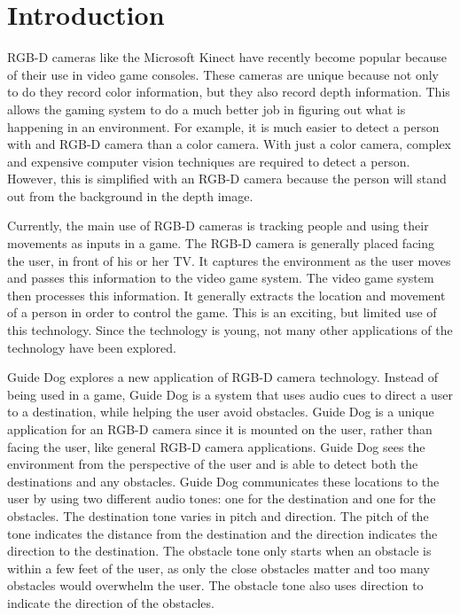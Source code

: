 \section{Introduction}
\label{sec:intro}

RGB-D cameras like the Microsoft Kinect\cite{kinect-website} have recently
become popular because of their use in video game consoles. These cameras are
unique because not only to do they record color information, but they also record
depth information. This allows the gaming system to do a much better job in
figuring out what is happening in an environment. For example, it is much easier
to detect a person with and RGB-D camera than a color camera. With just a color
camera, complex and expensive computer vision techniques are required to detect
a person. However, this is simplified with an RGB-D camera because the person
will stand out from the background in the depth image.

Currently, the main use of RGB-D cameras is tracking people and using their
movements as inputs in a game. The RGB-D camera is generally placed facing the
user, in front of his or her TV. It captures the environment as the user moves
and passes this information to the video game system. The video game system then
processes this information. It generally extracts the location and movement of a
person in order to control the game. This is an exciting, but limited use of
this technology. Since the technology is young, not many other applications of
the technology have been explored.

Guide Dog explores a new application of RGB-D camera technology. Instead of
being used in a game, Guide Dog is a system that uses audio cues to direct a
user to a destination, while helping the user avoid obstacles. Guide Dog is a
unique application for an RGB-D camera since it is mounted on the user, rather
than facing the user, like general RGB-D camera applications. Guide Dog sees the
environment from the perspective of the user and is able to detect both the
destinations and any obstacles. Guide Dog communicates these locations to the
user by using two different audio tones: one for the destination and one for the
obstacles. The destination tone varies in pitch and direction. The pitch of the
tone indicates the distance from the destination and the direction indicates the
direction to the destination. The obstacle tone only starts when an obstacle is
within a few feet of the user, as only the close obstacles matter and too many
obstacles would overwhelm the user. The obstacle tone also uses direction to
indicate the direction of the obstacles.

